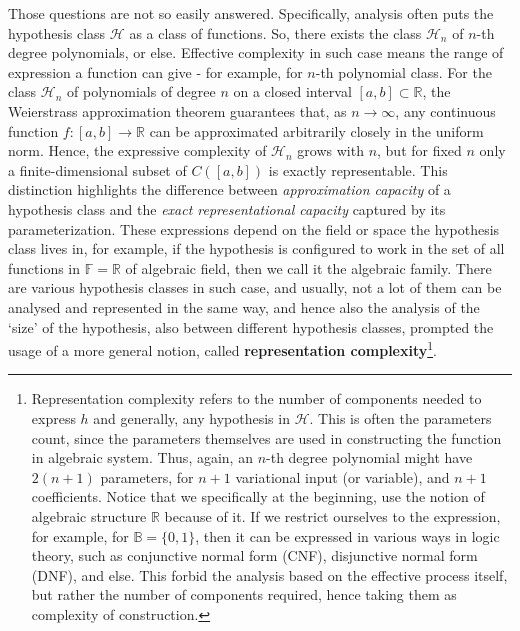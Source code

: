 \documentclass[
  journal=largetwo,
  year=2025,
  volume=37,
]{cup-journal}
\begin{document}
Those questions are not so easily answered. Specifically, analysis often puts the hypothesis class $\mathcal{H}$ as a class of functions. So, there exists the class $\mathcal{H}_{n}$ of $n$-th degree polynomials, or else. Effective complexity in such case means the range of expression a function can give - for example, for $n$-th polynomial class. For the class $\mathcal{H}_n$ of polynomials of degree $n$ on a closed interval $[a,b]\subset \mathbb{R}$, the Weierstrass approximation theorem guarantees that, as $n\to \infty$, any continuous function $f:[a,b]\to \mathbb{R}$ can be approximated arbitrarily closely in the uniform norm. Hence, the expressive complexity of $\mathcal{H}_n$ grows with $n$, but for fixed $n$ only a finite-dimensional subset of $C([a,b])$ is exactly representable. This distinction highlights the difference between \emph{approximation capacity} of a hypothesis class and the \emph{exact representational capacity} captured by its parameterization. These expressions depend on the field or space the hypothesis class lives in, for example, if the hypothesis is configured to work in the set of all functions in $\mathbb{F}=\mathbb{R}$ of algebraic field, then we call it the algebraic family. There are various hypothesis classes in such case, and usually, not a lot of them can be analysed and represented in the same way, and hence also the analysis of the `size' of the hypothesis, also between different hypothesis classes, prompted the usage of a more general notion, called \textbf{representation complexity}\footnote{Representation complexity refers to the number of components needed to express $h$ and generally, any hypothesis in $\mathcal{H}$. This is often the parameters count, since the parameters themselves are used in constructing the function in algebraic system. Thus, again, an $n$-th degree polynomial might have $2(n+1)$ parameters, for $n+1$ variational input (or variable), and $n+1$ coefficients. Notice that we specifically at the beginning, use the notion of algebraic structure $\mathbb{R}$ because of it. If we restrict ourselves to the expression, for example, for $\mathbb{B}=\{0,1\}$, then it can be expressed in various ways in logic theory, such as conjunctive normal form (CNF), disjunctive normal form (DNF), and else. This forbid the analysis based on the effective process itself, but rather the number of components required, hence taking them as complexity of construction.}.
\end{document}
